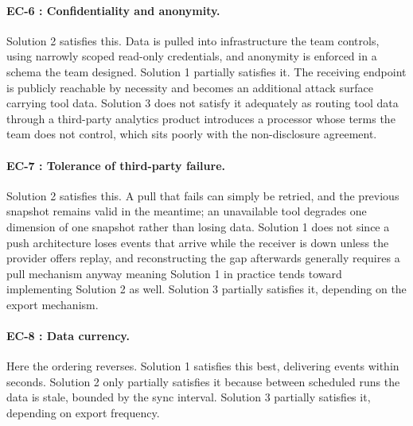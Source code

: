 \paragraph{EC-6 : Confidentiality and anonymity.}
Solution 2 satisfies this. Data is pulled into infrastructure the team controls, using
narrowly scoped read-only credentials, and anonymity is enforced in a schema the
team designed. Solution 1 partially satisfies it. The receiving endpoint is publicly
reachable by necessity and becomes an additional attack surface carrying tool
data. Solution 3 does not satisfy it adequately as routing tool data through a
third-party analytics product introduces a processor whose terms the team does
not control, which sits poorly with the non-disclosure agreement.

\paragraph{EC-7 : Tolerance of third-party failure.}
Solution 2 satisfies this. A pull that fails can simply be retried, and the previous
snapshot remains valid in the meantime; an unavailable tool degrades one
dimension of one snapshot rather than losing data. Solution 1 does not since a push
architecture loses events that arrive while the receiver is down unless the
provider offers replay, and reconstructing the gap afterwards generally requires
a pull mechanism anyway meaning Solution 1 in practice tends toward implementing Solution 2
as well. Solution 3 partially satisfies it, depending on the export mechanism.

\paragraph{EC-8 : Data currency.}
Here the ordering reverses. Solution 1 satisfies this best, delivering events within
seconds. Solution 2 only partially satisfies it because between scheduled runs the data is
stale, bounded by the sync interval. Solution 3 partially satisfies it, depending on
export frequency.

